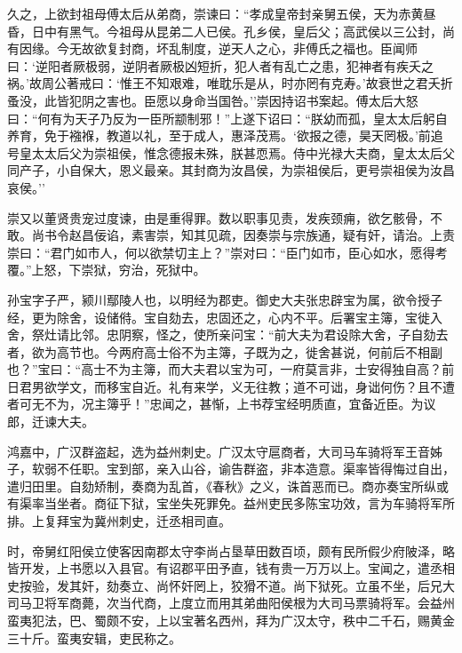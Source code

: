 \documentclass[]{article}
\begin{document}
久之，上欲封祖母傅太后从弟商，崇谏曰：``孝成皇帝封亲舅五侯，天为赤黄昼昏，日中有黑气。今祖母从昆弟二人已侯。孔乡侯，皇后父；高武侯以三公封，尚有因缘。今无故欲复封商，坏乱制度，逆天人之心，非傅氏之福也。臣闻师曰：`逆阳者厥极弱，逆阴者厥极凶短折，犯人者有乱亡之患，犯神者有疾夭之祸。'故周公著戒曰：`惟王不知艰难，唯耽乐是从，时亦罔有克寿。'故衰世之君夭折蚤没，此皆犯阴之害也。臣愿以身命当国咎。''崇因持诏书案起。傅太后大怒曰：``何有为天子乃反为一臣所颛制邪！''上遂下诏曰：``朕幼而孤，皇太太后躬自养育，免于襁褓，教道以礼，至于成人，惠泽茂焉。`欲报之德，昊天罔极。'前追号皇太太后父为崇祖侯，惟念德报未殊，朕甚恧焉。侍中光禄大夫商，皇太太后父同产子，小自保大，恩义最亲。其封商为汝昌侯，为崇祖侯后，更号崇祖侯为汝昌哀侯。''

崇又以董贤贵宠过度谏，由是重得罪。数以职事见责，发疾颈痈，欲乞骸骨，不敢。尚书令赵昌佞谄，素害崇，知其见疏，因奏崇与宗族通，疑有奸，请治。上责崇曰：``君门如市人，何以欲禁切主上？''崇对曰：``臣门如市，臣心如水，愿得考覆。''上怒，下崇狱，穷治，死狱中。

孙宝字子严，颍川鄢陵人也，以明经为郡吏。御史大夫张忠辟宝为属，欲令授子经，更为除舍，设储偫。宝自劾去，忠固还之，心内不平。后署宝主簿，宝徙入舍，祭灶请比邻。忠阴察，怪之，使所亲问宝：``前大夫为君设除大舍，子自劾去者，欲为高节也。今两府高士俗不为主簿，子既为之，徙舍甚说，何前后不相副也？''宝曰：``高士不为主簿，而大夫君以宝为可，一府莫言非，士安得独自高？前日君男欲学文，而移宝自近。礼有来学，义无往教；道不可诎，身诎何伤？且不遭者可无不为，况主簿乎！''忠闻之，甚惭，上书荐宝经明质直，宜备近臣。为议郎，迁谏大夫。

鸿嘉中，广汉群盗起，选为益州刺史。广汉太守扈商者，大司马车骑将军王音姊子，软弱不任职。宝到部，亲入山谷，谕告群盗，非本造意。渠率皆得悔过自出，遣归田里。自劾矫制，奏商为乱首，《春秋》之义，诛首恶而已。商亦奏宝所纵或有渠率当坐者。商征下狱，宝坐失死罪免。益州吏民多陈宝功效，言为车骑将军所排。上复拜宝为冀州刺史，迁丞相司直。

时，帝舅红阳侯立使客因南郡太守李尚占垦草田数百顷，颇有民所假少府陂泽，略皆开发，上书愿以入县官。有诏郡平田予直，钱有贵一万万以上。宝闻之，遣丞相史按验，发其奸，劾奏立、尚怀奸罔上，狡猾不道。尚下狱死。立虽不坐，后兄大司马卫将军商薨，次当代商，上度立而用其弟曲阳侯根为大司马票骑将军。会益州蛮夷犯法，巴、蜀颇不安，上以宝著名西州，拜为广汉太守，秩中二千石，赐黄金三十斤。蛮夷安辑，吏民称之。
\end{document}
